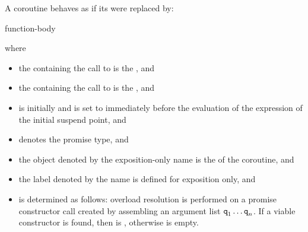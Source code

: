 \pnum
A coroutine behaves as if its  were replaced by:
\begin{ncsimplebnf}
\terminal{\{}\br
\bnfindent {}   \terminal{;}\br
\bnfindent {} \terminal{\{}\br
\bnfindent\bnfindent {}  \terminal{;}\br
\bnfindent\bnfindent function-body\br
\bnfindent {}\br
\bnfindent\bnfindent {}\br
\bnfindent\bnfindent\bnfindent {} \terminal{;}\br
\bnfindent\bnfindent {} \terminal{;}\br
\bnfindent \terminal{\}}\br
{} \terminal{:}\br
\bnfindent {}  \terminal{;}\br
\terminal{\}}
\end{ncsimplebnf}
where
\begin{itemize}
\item
the  containing
the call to 
is the , and
\item
the  containing
the call to 
is the , and
\item
{}
is initially  and is set to 
immediately before the evaluation
of the  expression
of the initial suspend point, and
\item
{} denotes the promise type, and
\item
the object denoted by the exposition-only name 
is the  of the coroutine, and
\item
the label denoted by the name 
is defined for exposition only, and
\item
{} is determined as follows:
overload resolution is performed on a promise constructor call created by
assembling an argument list $\texttt{q}_1 \dotsc \texttt{q}_n$. If a viable
constructor is found, then
 is
, otherwise
 is empty.
\end{itemize}

